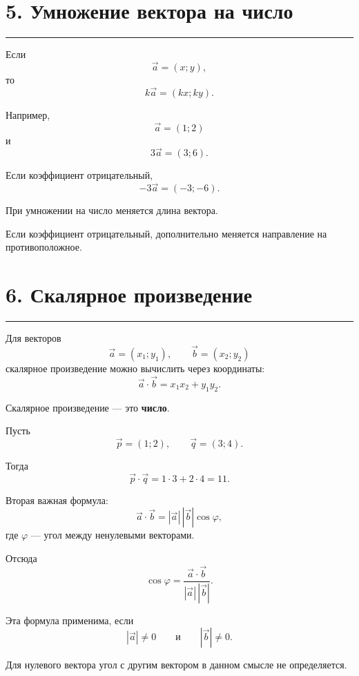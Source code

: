 \documentclass[a4paper,12pt]{article}
\newcommand{\sectionline}{%
    \par\noindent
    {\color{accent}\rule{\linewidth}{0.6pt}}
    \par
}
\begin{document}
\section*{\color{darkaccent}5. Умножение вектора на число}

\sectionline

Если
\[
\vec a=(x;y),
\]
то
\[
\boxed{
k\vec a=(kx;ky).
}
\]

Например,
\[
\vec a=(1;2)
\]
и
\[
3\vec a=(3;6).
\]

Если коэффициент отрицательный,
\[
-3\vec a=(-3;-6).
\]

\begin{keybox}
При умножении на число меняется длина вектора.

Если коэффициент отрицательный, дополнительно меняется направление
на противоположное.
\end{keybox}


\section*{\color{darkaccent}6. Скалярное произведение}

\sectionline

Для векторов
\[
\vec a=(x_1;y_1),
\qquad
\vec b=(x_2;y_2)
\]
скалярное произведение можно вычислить через координаты:
\[
\boxed{
\vec a\cdot\vec b=x_1x_2+y_1y_2.
}
\]

Скалярное произведение --- это \textbf{число}.

\begin{examplebox}[Пример]
Пусть
\[
\vec p=(1;2),
\qquad
\vec q=(3;4).
\]

Тогда
\[
\vec p\cdot\vec q
=
1\cdot3+2\cdot4
=
11.
\]
\end{examplebox}

Вторая важная формула:
\[
\boxed{
\vec a\cdot\vec b
=
|\vec a|\,|\vec b|\cos\varphi,
}
\]
где \(\varphi\) --- угол между ненулевыми векторами.

Отсюда
\[
\boxed{
\cos\varphi
=
\frac{\vec a\cdot\vec b}
{|\vec a|\,|\vec b|}.
}
\]

Эта формула применима, если
\[
|\vec a|\ne0
\qquad\text{и}\qquad
|\vec b|\ne0.
\]

Для нулевого вектора угол с другим вектором в данном смысле
не определяется.



\end{document}
